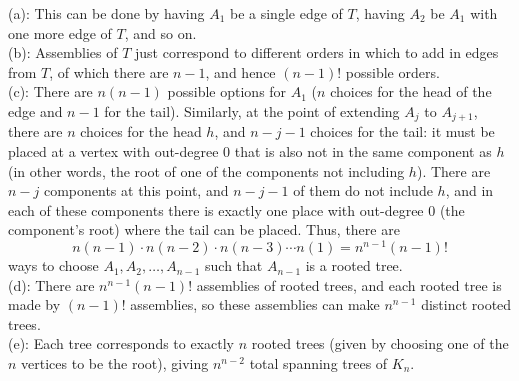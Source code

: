 \documentclass{amsart}
\begin{document}
	(a): This can be done by having $A_1$ be a single edge of $T$, having $A_2$ be $A_1$ with one more edge of $T$, and so on.\\
	
	(b): Assemblies of $T$ just correspond to different orders in which to add in edges from $T$, of which there are $n-1$, and hence $(n-1)!$ possible orders.\\
	
	(c): There are $n(n-1)$ possible options for $A_1$ ($n$ choices for the head of the edge and $n-1$ for the tail). Similarly, at the point of extending $A_j$ to $A_{j+1}$, there are $n$ choices for the head $h$, and $n-j-1$ choices for the tail: it must be placed at a vertex with out-degree 0 that is also not in the same component as $h$ (in other words, the root of one of the components not including $h$). There are $n-j$ components at this point, and $n-j-1$ of them do not include $h$, and in each of these components there is exactly one place with out-degree 0 (the component's root) where the tail can be placed. Thus, there are 
	$$
	n(n-1) \cdot n(n-2) \cdot n(n-3) \cdots n(1) = n^{n-1} (n-1)!
	$$
	ways to choose $A_1,A_2,\dots,A_{n-1}$ such that $A_{n-1}$ is a rooted tree.\\
	
	(d): There are $n^{n-1}(n-1)!$ assemblies of rooted trees, and each rooted tree is made by $(n-1)!$ assemblies, so these assemblies can make $n^{n-1}$ distinct rooted trees.\\
	
	(e): Each tree corresponds to exactly $n$ rooted trees (given by choosing one of the $n$ vertices to be the root), giving $n^{n-2}$ total spanning trees of $K_n$.
	
\end{document}
